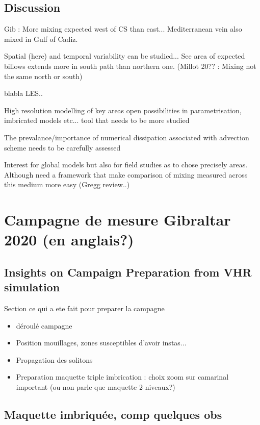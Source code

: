 \subsection{Discussion}
Gib :
More mixing expected west of CS than east... Mediterranean vein also mixed in Gulf of Cadiz.

Spatial (here) and temporal variability can be studied... See area of expected billows extends more in south path than northern one. (Millot 20?? : Mixing not the same north or south)



blabla LES..

High resolution modelling of key areas open possibilities in parametrisation, imbricated models etc... tool that needs to be more studied 

The prevalance/importance of numerical dissipation associated with advection scheme needs to be carefully assessed

Interest for global models but also for field studies as to chose precisely areas. Although need a framework that make comparison of mixing measured across this medium more easy (Gregg review..)


\section{Campagne de mesure Gibraltar 2020 (en anglais?)}
\subsection{Insights on Campaign Preparation from VHR simulation}
Section ce qui a ete fait pour preparer la campagne

\begin{itemize}
\item déroulé campagne
\item Position mouillages, zones susceptibles d'avoir instas...
\item Propagation des solitons
\item Preparation maquette triple imbrication : choix zoom sur camarinal important (ou non parle que maquette 2 niveaux?)
\end{itemize}


\subsection{Maquette imbriquée, comp quelques obs}





